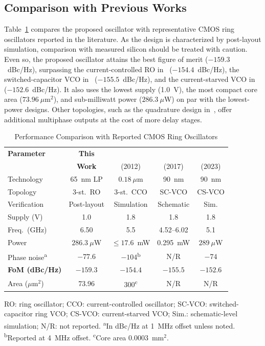 \documentclass[conference,a4paper]{IEEEtran} %
\begin{document}
\subsection{Comparison with Previous Works}
Table~\ref{tab:comparison} compares the proposed oscillator with representative
CMOS ring oscillators reported in the literature. As the design is characterized
by post-layout simulation, comparison with measured silicon should be treated
with caution. Even so, the proposed oscillator attains the best figure of merit
($-159.3$~dBc/Hz), surpassing the current-controlled RO in~\cite{nugroho_ring}
($-154.4$~dBc/Hz), the switched-capacitor VCO in~\cite{islam_mos}
($-155.5$~dBc/Hz), and the current-starved VCO in~\cite{anjum_csvco}
($-152.6$~dBc/Hz). It also uses the lowest supply (1.0~V), the most compact core
area ($73.96~\mu\text{m}^2$), and sub-milliwatt power ($286.3~\mu$W) on par
with the lowest-power designs. Other topologies, such as the quadrature design
in~\cite{pokharel_quadrature}, offer additional multiphase outputs at the cost
of more delay stages.

\begin{table}[!t]
\caption{Performance Comparison with Reported CMOS Ring Oscillators}
\label{tab:comparison}
\begin{center}
\footnotesize
\setlength{\tabcolsep}{3.5pt}
\renewcommand{\arraystretch}{1.15}
\begin{tabular}{lcccc}
\toprule
\textbf{Parameter} & \textbf{This} & \cite{nugroho_ring} & \cite{islam_mos} & \cite{anjum_csvco} \\
                   & \textbf{Work} & (2012) & (2017) & (2023) \\
\midrule
Technology        & 65~nm LP            & $0.18~\mu$m   & 90~nm      & 90~nm \\
Topology          & 3-st.\ RO           & 3-st.\ CCO    & SC-VCO     & CS-VCO \\
Verification      & Post-layout         & Simulation      & Schematic  & Sim. \\
Supply (V)        & 1.0                 & 1.8           & 1.8        & 1.8 \\
Freq.\ (GHz)      & 6.50                & 5.5           & 4.52--6.02 & 5.1 \\
Power             & $286.3~\mu$W        & $\leq 17.6$~mW & 0.295~mW  & $289~\mu$W \\
Phase noise\textsuperscript{a} & $-77.6$ & $-104$\textsuperscript{b} & N/R & $-74$ \\
\textbf{FoM (dBc/Hz)} & $\mathbf{-159.3}$ & $-154.4$  & $-155.5$   & $-152.6$ \\
Area ($\mu$m$^2$) & 73.96               & 300\textsuperscript{c} & N/R & N/R \\
\bottomrule
\end{tabular}
\end{center}
\footnotesize
\noindent RO: ring oscillator; CCO: current-controlled oscillator; SC-VCO: switched-capacitor ring VCO; CS-VCO: current-starved VCO; Sim.: schematic-level simulation; N/R: not reported. \textsuperscript{a}In dBc/Hz at 1~MHz offset unless noted. \textsuperscript{b}Reported at 4~MHz offset. \textsuperscript{c}Core area $0.0003$~mm$^2$.
\end{table}
\end{document}

